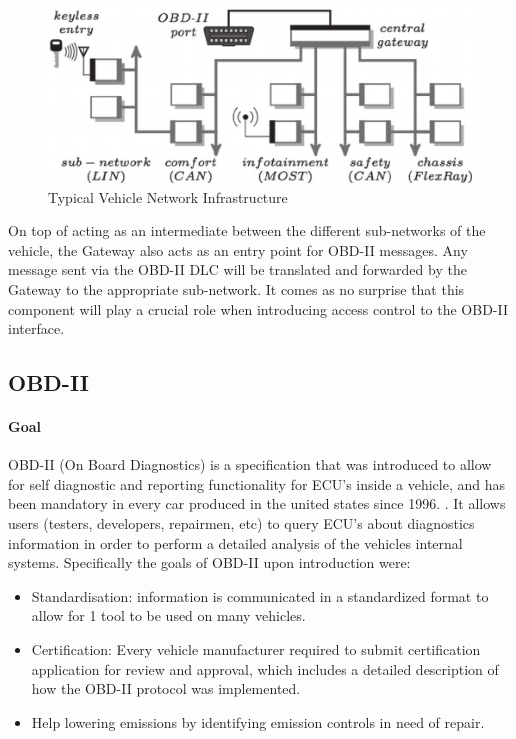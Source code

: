 \documentclass[11pt]{article}
\begin{document}
\begin{figure}[h]
	\label{fig:gateway}
	\centering
	\includegraphics[width=\textwidth]{gateway.png}
	\caption{Typical Vehicle Network Infrastructure \cite{Petit}}
\end{figure}

On top of acting as an intermediate between the different sub-networks of the vehicle, the Gateway also acts as an entry point for OBD-II messages. Any message sent via the OBD-II DLC will be translated and forwarded by the Gateway to the appropriate sub-network. It comes as no surprise that this component will play a crucial role when introducing access control to the OBD-II interface.

\subsection{OBD-II}
\label{sec:obd}

\paragraph{Goal} OBD-II (On Board Diagnostics) is a specification that was introduced to allow for self diagnostic and reporting functionality for ECU's inside a vehicle, and has been mandatory in every car produced in the united states since 1996. \cite{ODBwiki}. It allows users (testers, developers, repairmen, etc) to query ECU's about diagnostics information in order to perform a detailed analysis of the vehicles internal systems. Specifically the goals of OBD-II upon introduction were: 
\begin{itemize}
	\item Standardisation: information is communicated in a standardized format to allow for 1 tool to be used on many vehicles.
	\item Certification: Every vehicle manufacturer required to submit certification application for review and approval, which includes a detailed description of how the OBD-II protocol was implemented.
	\item Help lowering emissions by identifying emission controls in need of repair.
\end{itemize} 
\end{document}
